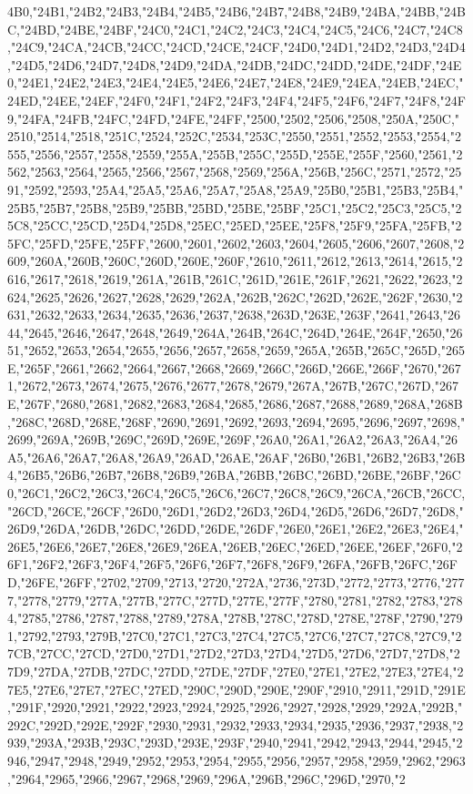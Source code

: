 4B0,"24B1,"24B2,"24B3,"24B4,"24B5,"24B6,"24B7,"24B8,"24B9,"24BA,"24BB,"24BC,"24BD,"24BE,"24BF,"24C0,"24C1,"24C2,"24C3,"24C4,"24C5,"24C6,"24C7,"24C8,"24C9,"24CA,"24CB,"24CC,"24CD,"24CE,"24CF,"24D0,"24D1,"24D2,"24D3,"24D4,"24D5,"24D6,"24D7,"24D8,"24D9,"24DA,"24DB,"24DC,"24DD,"24DE,"24DF,"24E0,"24E1,"24E2,"24E3,"24E4,"24E5,"24E6,"24E7,"24E8,"24E9,"24EA,"24EB,"24EC,"24ED,"24EE,"24EF,"24F0,"24F1,"24F2,"24F3,"24F4,"24F5,"24F6,"24F7,"24F8,"24F9,"24FA,"24FB,"24FC,"24FD,"24FE,"24FF,"2500,"2502,"2506,"2508,"250A,"250C,"2510,"2514,"2518,"251C,"2524,"252C,"2534,"253C,"2550,"2551,"2552,"2553,"2554,"2555,"2556,"2557,"2558,"2559,"255A,"255B,"255C,"255D,"255E,"255F,"2560,"2561,"2562,"2563,"2564,"2565,"2566,"2567,"2568,"2569,"256A,"256B,"256C,"2571,"2572,"2591,"2592,"2593,"25A4,"25A5,"25A6,"25A7,"25A8,"25A9,"25B0,"25B1,"25B3,"25B4,"25B5,"25B7,"25B8,"25B9,"25BB,"25BD,"25BE,"25BF,"25C1,"25C2,"25C3,"25C5,"25C8,"25CC,"25CD,"25D4,"25D8,"25EC,"25ED,"25EE,"25F8,"25F9,"25FA,"25FB,"25FC,"25FD,"25FE,"25FF,"2600,"2601,"2602,"2603,"2604,"2605,"2606,"2607,"2608,"2609,"260A,"260B,"260C,"260D,"260E,"260F,"2610,"2611,"2612,"2613,"2614,"2615,"2616,"2617,"2618,"2619,"261A,"261B,"261C,"261D,"261E,"261F,"2621,"2622,"2623,"2624,"2625,"2626,"2627,"2628,"2629,"262A,"262B,"262C,"262D,"262E,"262F,"2630,"2631,"2632,"2633,"2634,"2635,"2636,"2637,"2638,"263D,"263E,"263F,"2641,"2643,"2644,"2645,"2646,"2647,"2648,"2649,"264A,"264B,"264C,"264D,"264E,"264F,"2650,"2651,"2652,"2653,"2654,"2655,"2656,"2657,"2658,"2659,"265A,"265B,"265C,"265D,"265E,"265F,"2661,"2662,"2664,"2667,"2668,"2669,"266C,"266D,"266E,"266F,"2670,"2671,"2672,"2673,"2674,"2675,"2676,"2677,"2678,"2679,"267A,"267B,"267C,"267D,"267E,"267F,"2680,"2681,"2682,"2683,"2684,"2685,"2686,"2687,"2688,"2689,"268A,"268B,"268C,"268D,"268E,"268F,"2690,"2691,"2692,"2693,"2694,"2695,"2696,"2697,"2698,"2699,"269A,"269B,"269C,"269D,"269E,"269F,"26A0,"26A1,"26A2,"26A3,"26A4,"26A5,"26A6,"26A7,"26A8,"26A9,"26AD,"26AE,"26AF,"26B0,"26B1,"26B2,"26B3,"26B4,"26B5,"26B6,"26B7,"26B8,"26B9,"26BA,"26BB,"26BC,"26BD,"26BE,"26BF,"26C0,"26C1,"26C2,"26C3,"26C4,"26C5,"26C6,"26C7,"26C8,"26C9,"26CA,"26CB,"26CC,"26CD,"26CE,"26CF,"26D0,"26D1,"26D2,"26D3,"26D4,"26D5,"26D6,"26D7,"26D8,"26D9,"26DA,"26DB,"26DC,"26DD,"26DE,"26DF,"26E0,"26E1,"26E2,"26E3,"26E4,"26E5,"26E6,"26E7,"26E8,"26E9,"26EA,"26EB,"26EC,"26ED,"26EE,"26EF,"26F0,"26F1,"26F2,"26F3,"26F4,"26F5,"26F6,"26F7,"26F8,"26F9,"26FA,"26FB,"26FC,"26FD,"26FE,"26FF,"2702,"2709,"2713,"2720,"272A,"2736,"273D,"2772,"2773,"2776,"2777,"2778,"2779,"277A,"277B,"277C,"277D,"277E,"277F,"2780,"2781,"2782,"2783,"2784,"2785,"2786,"2787,"2788,"2789,"278A,"278B,"278C,"278D,"278E,"278F,"2790,"2791,"2792,"2793,"279B,"27C0,"27C1,"27C3,"27C4,"27C5,"27C6,"27C7,"27C8,"27C9,"27CB,"27CC,"27CD,"27D0,"27D1,"27D2,"27D3,"27D4,"27D5,"27D6,"27D7,"27D8,"27D9,"27DA,"27DB,"27DC,"27DD,"27DE,"27DF,"27E0,"27E1,"27E2,"27E3,"27E4,"27E5,"27E6,"27E7,"27EC,"27ED,"290C,"290D,"290E,"290F,"2910,"2911,"291D,"291E,"291F,"2920,"2921,"2922,"2923,"2924,"2925,"2926,"2927,"2928,"2929,"292A,"292B,"292C,"292D,"292E,"292F,"2930,"2931,"2932,"2933,"2934,"2935,"2936,"2937,"2938,"2939,"293A,"293B,"293C,"293D,"293E,"293F,"2940,"2941,"2942,"2943,"2944,"2945,"2946,"2947,"2948,"2949,"2952,"2953,"2954,"2955,"2956,"2957,"2958,"2959,"2962,"2963,"2964,"2965,"2966,"2967,"2968,"2969,"296A,"296B,"296C,"296D,"2970,"2
